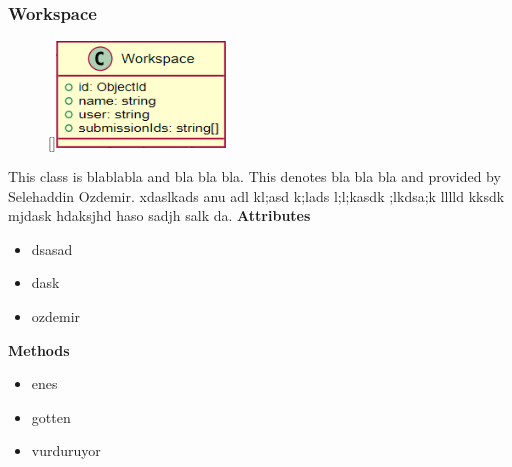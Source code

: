 \subsubsection{Workspace}
\begin{figure}
    \raisebox{0pt}[\dimexpr{}\baselineskip\relax]{\includegraphics[width=4.5cm]{classes/workspace-management/2.png}}
\end{figure} 
\par
This class is blablabla and bla bla bla. This denotes bla bla bla and provided by Selehaddin Ozdemir. xdaslkads anu adl kl;asd k;lads l;l;kasdk ;lkdsa;k lllld kksdk mjdask hdaksjhd haso sadjh salk da.
\newline
\newline
\textbf{Attributes}
\begin{itemize}
    \item dsasad
    \item dask
    \item ozdemir
\end{itemize}
\textbf{Methods}
\begin{itemize}
    \item enes
    \item gotten
    \item vurduruyor
\end{itemize}

